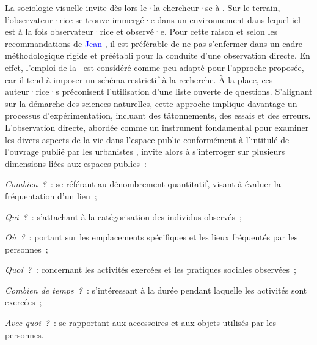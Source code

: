 \begin{refsegment}
La sociologie visuelle invite dès lors le·la chercheur·se à  \textcolor{blue}{\autocite[14]{maresca_photographie_1996}}. Sur le terrain, l'observateur·rice se trouve immergé·e dans un environnement dans lequel iel est à la fois observateur·rice et observé·e. Pour cette raison et selon les recommandations de \textcolor{blue}{Jean} \textcolor{blue}{\textcite[126]{peneff_mesure_1995}}, il est préférable de ne pas s'enfermer dans un cadre méthodologique rigide et préétabli pour la conduite d'une observation directe. En effet, l'emploi de la ~est considéré comme peu adapté pour l'approche proposée, car il tend à imposer un schéma restrictif à la recherche. À la place, ces auteur·rice·s préconisent l'utilisation d'une liste ouverte de questions. S'alignant sur la démarche des sciences naturelles, cette approche implique davantage un processus d'expérimentation, incluant des tâtonnements, des essais et des erreurs. L'observation directe, abordée comme un instrument fondamental pour examiner les divers aspects de la vie dans l'\gls{espace public} conformément à l'intitulé de l'ouvrage publié par les urbanistes \textcolor{blue}{\textcite[19]{gehl_vie_2019}}, invite alors à s'interroger sur plusieurs dimensions liées aux espaces publics~:
    \begin{customitemize}
\item \textsl{Combien~?}~: se référant au dénombrement quantitatif, visant à évaluer la fréquentation d'un lieu~;
\item \textsl{Qui~?}~: s'attachant à la catégorisation des individus observés~;
\item \textsl{Où~?}~: portant sur les emplacements spécifiques et les lieux fréquentés par les personnes~;
\item \textsl{Quoi~?}~: concernant les activités exercées et les pratiques sociales observées~;
\item \textsl{Combien de temps~?}~: s'intéressant à la durée pendant laquelle les activités sont exercées~;
\item \textsl{Avec quoi~?}~: se rapportant aux accessoires et aux objets utilisés par les personnes.
    \end{customitemize}%


\end{refsegment}
